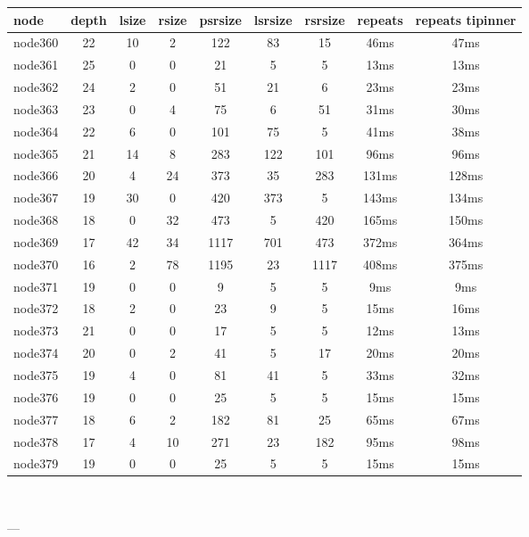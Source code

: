 \begin{tabular}{|l|c|c|c|c|c|c|c|c|}
\hline node & depth & lsize & rsize & psrsize & lsrsize & rsrsize   & repeats & repeats tipinner\\
    \hline node360 & 22 & 10 & 2 & 122 & 83 & 15 & 46ms & 47ms\\
    \hline node361 & 25 & 0 & 0 & 21 & 5 & 5 & 13ms & 13ms\\
    \hline node362 & 24 & 2 & 0 & 51 & 21 & 6 & 23ms & 23ms\\
    \hline node363 & 23 & 0 & 4 & 75 & 6 & 51 & 31ms & 30ms\\
    \hline node364 & 22 & 6 & 0 & 101 & 75 & 5 & 41ms & 38ms\\
    \hline node365 & 21 & 14 & 8 & 283 & 122 & 101 & 96ms & 96ms\\
    \hline node366 & 20 & 4 & 24 & 373 & 35 & 283 & 131ms & 128ms\\
    \hline node367 & 19 & 30 & 0 & 420 & 373 & 5 & 143ms & 134ms\\
    \hline node368 & 18 & 0 & 32 & 473 & 5 & 420 & 165ms & 150ms\\
    \hline node369 & 17 & 42 & 34 & 1117 & 701 & 473 & 372ms & 364ms\\
    \hline node370 & 16 & 2 & 78 & 1195 & 23 & 1117 & 408ms & 375ms\\
    \hline node371 & 19 & 0 & 0 & 9 & 5 & 5 & 9ms & 9ms\\
    \hline node372 & 18 & 2 & 0 & 23 & 9 & 5 & 15ms & 16ms\\
    \hline node373 & 21 & 0 & 0 & 17 & 5 & 5 & 12ms & 13ms\\
    \hline node374 & 20 & 0 & 2 & 41 & 5 & 17 & 20ms & 20ms\\
    \hline node375 & 19 & 4 & 0 & 81 & 41 & 5 & 33ms & 32ms\\
    \hline node376 & 19 & 0 & 0 & 25 & 5 & 5 & 15ms & 15ms\\
    \hline node377 & 18 & 6 & 2 & 182 & 81 & 25 & 65ms & 67ms\\
    \hline node378 & 17 & 4 & 10 & 271 & 23 & 182 & 95ms & 98ms\\
    \hline node379 & 19 & 0 & 0 & 25 & 5 & 5 & 15ms & 15ms\\

\hline
\end{tabular} \

---


